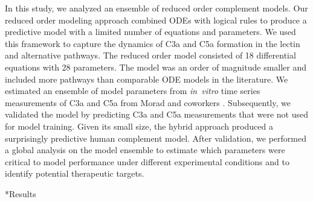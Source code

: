 \documentclass[12pt]{article}
\makeatletter
\renewcommand\section{\@startsection
	{subsection}{2}{0mm}
	{-0.2in}
	{0.05\baselineskip}
	{\normalfont\large\bfseries}}
\makeatother
\begin{document}
In this study, we analyzed an ensemble of reduced order complement models.
Our reduced order modeling approach combined ODEs with logical rules to produce a predictive model with a limited number of equations and parameters.
We used this framework to capture the dynamics of C3a and C5a formation in the lectin and alternative pathways.
The reduced order model consisted of 18 differential equations with 28 parameters.
The model was an order of magnitude smaller and included more pathways than comparable ODE models in the literature.
We estimated an ensemble of model parameters from \textit{in~vitro} time series measurements of C3a and C5a from Morad and coworkers \cite{morad2015time}.
Subsequently, we validated the model by predicting C3a and C5a measurements that were not used for model training.
Given its small size, the hybrid approach produced a surprisingly predictive human complement model.
After validation, we performed a global analysis on the model ensemble to estimate which parameters were critical to model performance under different experimental conditions and to identify potential therapeutic targets.

\clearpage

\section*{Results}
\end{document}
